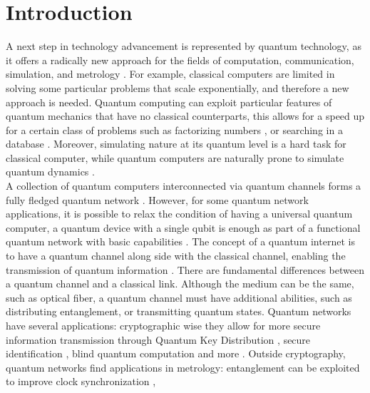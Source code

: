 \documentclass[english, a4paper, 12pt, twoside]{book}
\numberwithin{equation}{section} %
\begin{document}
\newpage
\tableofcontents


\newpage
{} %
\setcounter{page}{1} %

\chapter{Introduction} %
A next step in technology advancement is represented by quantum technology, as it offers a radically new approach for the fields of computation, communication, simulation, and metrology \cite{quantumtech}. For example, classical computers are limited in solving some particular problems that scale exponentially, and therefore a new approach is needed. Quantum computing can exploit particular features of quantum mechanics that have no classical counterparts, this allows for a speed up for a certain class of problems such as factorizing numbers \cite{shor}, or searching in a database \cite{grover}. Moreover, simulating nature at its quantum level is a hard task for classical computer, while quantum computers are naturally prone to simulate quantum dynamics \cite{RevModPhys.86.153}.\\
A collection of quantum computers interconnected via quantum channels forms a fully fledged quantum network \cite{kimble}. However, for some quantum network applications, it is possible to relax the condition of having a universal quantum computer, a quantum device with a single qubit is enough as part of a functional quantum network with basic capabilities \cite{Wehnereaam9288}. The concept of a quantum internet is to have a quantum channel along side with the classical channel, enabling the transmission of quantum information \cite{Wehnereaam9288}. There are fundamental differences between a quantum channel and a classical link. Although the medium can be the same, such as optical fiber, a quantum channel must have additional abilities, such as distributing entanglement, or transmitting quantum states. Quantum networks have several applications: cryptographic wise they allow for more secure information transmission through Quantum Key Distribution \cite{qkd2}, secure identification \cite{secureident}, blind quantum computation \cite{blindcomputation} and more \cite{Wehnereaam9288}. Outside cryptography, quantum networks find applications in metrology: entanglement can be exploited to improve clock synchronization \cite{quantumclocks},
\end{document}

